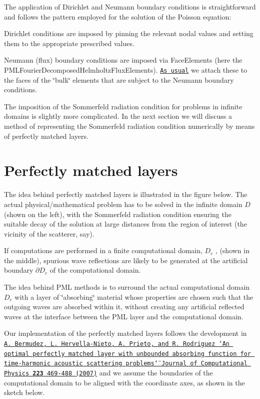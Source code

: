 The application of Dirichlet and Neumann boundary conditions is straightforward and follows the pattern employed for the solution of the Poisson equation\+:
\begin{DoxyItemize}
\item Dirichlet conditions are imposed by pinning the relevant nodal values and setting them to the appropriate prescribed values.
\item Neumann (flux) boundary conditions are imposed via {\ttfamily Face\+Elements} (here the {\ttfamily P\+M\+L\+Fourier\+Decomposed\+Helmholtz\+Flux\+Elements}). \href{../../../poisson/two_d_poisson_flux_bc/html/index.html}{\tt As usual} we attach these to the faces of the \char`\"{}bulk\char`\"{} elements that are subject to the Neumann boundary conditions.
\end{DoxyItemize}The imposition of the Sommerfeld radiation condition for problems in infinite domains is slightly more complicated. In the next section we will discuss a method of representing the Sommerfeld radiation condition numerically by means of perfectly matched layers.



\hypertarget{index_pml}{}\section{Perfectly matched layers}\label{index_pml}
The idea behind perfectly matched layers is illustrated in the figure below. The actual physical/mathematical problem has to be solved in the infinite domain $ D $ (shown on the left), with the Sommerfeld radiation condition ensuring the suitable decay of the solution at large distances from the region of interest (the vicinity of the scatterer, say).

If computations are performed in a finite computational domain, $ D_c $ , (shown in the middle), spurious wave reflections are likely to be generated at the artificial boundary $ \partial D_c $ of the computational domain.

The idea behind P\+ML methods is to surround the actual computational domain $ D_c $ with a layer of \char`\"{}absorbing\char`\"{} material whose properties are chosen such that the outgoing waves are absorbed within it, without creating any artificial reflected waves at the interface between the P\+ML layer and the computational domain.

Our implementation of the perfectly matched layers follows the development in \href{http://www.sciencedirect.com/science/article/pii/S0021999106004487}{\tt A. Bermudez, L. Hervella-\/\+Nieto, A. Prieto, and R. Rodriguez \char`\"{}\+An optimal perfectly matched layer with unbounded 
absorbing function for time-\/harmonic acoustic scattering problems\char`\"{} Journal of Computational Physics {\bfseries 223} 469-\/488 (2007)} and we assume the boundaries of the computational domain to be aligned with the coordinate axes, as shown in the sketch below.

